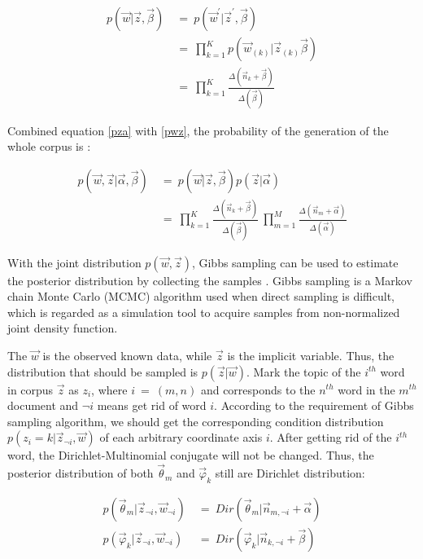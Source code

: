 \begin{equation}\label{pwz}
\begin{aligned}
    p(\vec w|\vec z, \vec\beta)\ &=\ p(\vec w^{'}|\vec z^{'}, \vec\beta)\\
    &=\ \prod_{k=1}^{K}p(\vec w_{(k)}|\vec z_{(k)}\vec\beta)\\
    &=\ \prod_{k=1}^{K}\frac{\Delta(\vec n_k+\vec\beta)}{\Delta(\vec\beta)}
\end{aligned}
\end{equation}

Combined equation \ref{pza} with \ref{pwz}, the probability of the generation of the whole corpus is \cite{heinrich2005parameter}:

\begin{equation}
\begin{aligned}
    p(\vec w,\vec z|\vec\alpha,\vec\beta)\ &=\ p(\vec w|\vec z,\vec\beta)p(\vec z|\vec\alpha)\\
    &=\ \prod_{k=1}^{K}\frac{\Delta(\vec n_k+\vec\beta)}{\Delta(\vec\beta)}\ \prod_{m=1}^{M}\frac{\Delta(\vec n_m+\vec\alpha)}{\Delta(\vec\alpha)}
\end{aligned}
\end{equation}

With the joint distribution $p(\vec w,\vec z)$, Gibbs sampling can be used to estimate the posterior distribution by collecting the samples \cite{hrycej1990gibbs}. Gibbs sampling is a Markov chain Monte Carlo (MCMC) algorithm used when direct sampling is difficult\cite{enwiki:992631521}, which is regarded as a simulation tool to acquire samples from non-normalized joint density function\cite{gelfand2000gibbs}.

The $\vec w$ is the observed known data, while $\vec z$ is the implicit variable. Thus, the distribution that should be sampled is $p(\vec z|\vec w)$. Mark the topic of the $i^{th}$ word in corpus $\vec z$ as $z_i$, where $i\ =\ (m,n)$ and corresponds to the $n^{th}$ word in the $m^{th}$ document and $\lnot i$ means get rid of word $i$. According to the requirement of Gibbs sampling algorithm, we should get the corresponding condition distribution $p(z_i=k|\vec z_{\lnot i},\vec w)$ of each arbitrary coordinate axis $i$. After getting rid of the $i^{th}$ word, the Dirichlet-Multinomial conjugate will not be changed. Thus, the posterior distribution of both $\vec\theta_m$ and $\vec\varphi_k$ still are Dirichlet distribution:

    \begin{equation}\label{parameters}
    \begin{split}
        p(\vec\theta_m|\vec z_{\lnot i},\vec w_{\lnot i})\ &=\ Dir(\vec\theta_m|\vec n_{m, \lnot i}+\vec\alpha)\\
        p(\vec\varphi_k|\vec z_{\lnot i},\vec w_{\lnot i})\ &=\ Dir(\vec\varphi_k|\vec n_{k, \lnot i}+\vec\beta)
    \end{split}
    \end{equation}

